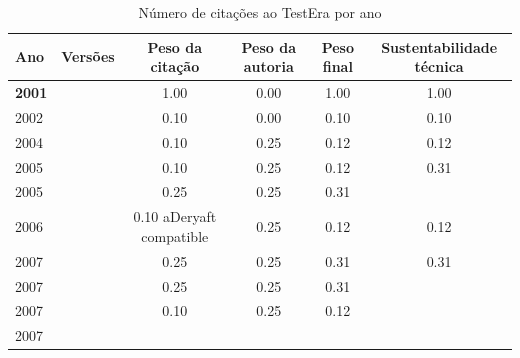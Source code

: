 \begin{table}[H]
\caption{Número de citações ao TestEra por ano}
\centering
\begin{tabular}{| l | c | c | c | c | c |}
  \hline
  Ano & Versões & Peso da citação & Peso da autoria & Peso final & Sustentabilidade técnica \\
  \hline
            {\bf 2001}
          &
          
          &
          1.00
          &
          0.00
          &
          1.00
          &
            {\color{blue} 1.00}
          \\
\hline
            2002
          &
          
          &
          0.10
          &
          0.00
          &
          0.10
          &
            {\color{red} 0.10}
          \\
\hline
            2004
          &
          
          &
          0.10
          &
          0.25
          &
          0.12
          &
            {\color{red} 0.12}
          \\
\hline
            2005
          &
          
          &
          0.10
          &
          0.25
          &
          0.12
          &
            {\color{red} 0.31}
          \\
            2005
          &
          
          &
          0.25
          &
          0.25
          &
          0.31
          &
          \\
\hline
            2006
          &
          
          &
          0.10
            {\tiny aDeryaft compatible}
          &
          0.25
          &
          0.12
          &
            {\color{red} 0.12}
          \\
\hline
            2007
          &
          
          &
          0.25
          &
          0.25
          &
          0.31
          &
            {\color{red} 0.31}
          \\
            2007
          &
          
          &
          0.25
          &
          0.25
          &
          0.31
          &
          \\
            2007
          &
          
          &
          0.10
          &
          0.25
          &
          0.12
          &
          \\
            2007
          &
          

\end{tabular}
\end{table}
